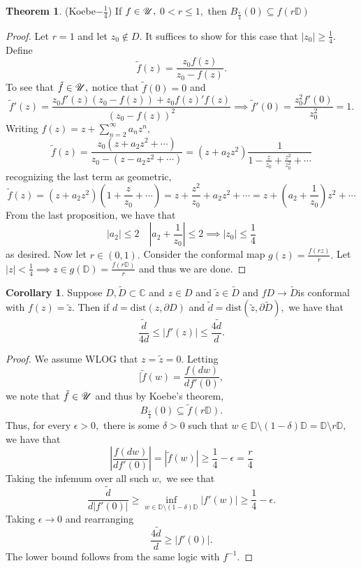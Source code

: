 \documentclass[10pt, oneside]{article}
\newcommand{\bbC}{\mathbb{C}}
\newcommand{\sm}{\setminus}
\theoremstyle{definition}
\newtheorem{thm}{Theorem}
\newtheorem{cor}{Corollary}
\newcommand{\bbC}{\mathbb{C}}
\newcommand{\bbD}{\mathbb{D}}
\newcommand{\sm}{\setminus}
\begin{document}
\begin{thm} (Koebe$-\frac{1}{4}$)
    If $f\in \cal U,$ $0<r\leq 1,$ then $B_{\frac{r}{4}}(0)\subseteq f(r\mathbb{D})$
\end{thm}
\begin{proof}
    Let $r = 1$ and let $z_0 \notin D.$ It suffices to show for this case that $|z_0| \geq \frac{1}{4}.$ Define 
    \[\tilde{f}(z) = \frac{z_0 f(z)}{z_0 - f(z)}.\] To see that $\tilde{f} \in \cal U,$ notice that $\tilde{f}(0) = 0$ and 
    \[\tilde{f}'(z) = \frac{z_0f'(z)(z_0 - f(z)) + z_0f(z)'f(z)}{(z_0 - f(z))^2} \implies \tilde{f}'(0) = \frac{z_0^2 f'(0)}{z_0^2} = 1.\] Writing $f(z) = z + \sum_{n=2}^\infty a_n z^n,$ 
    \[\tilde{f}(z) = \frac{z_0(z + a_2z^2 + \cdots)}{z_0 - (z - a_2z^2 + \cdots)}= (z + a_2z^2)\frac{1}{1 - \frac{z}{z_0} + \frac{z^2}{z_0^2} + \cdots} \] recognizing the last term as geometric, 
    \[\tilde{f}(z) = (z + a_2z^2)(1 + \frac{z}{z_0} + \cdots) = z + \frac{z^2}{z_0} + a_2z^2 + \cdots = z + (a_2 + \frac{1}{z_0})z^2 + \cdots\] From the last proposition, we have that 
    \[|a_2| \leq 2 \quad |a_2 + \frac{1}{z_0}| \leq 2 \implies |z_0| \leq \frac{1}{4}\] as desired. Now let $r \in (0,1).$ Consider the conformal map $g(z) = \frac{f(rz)}{r}.$ Let $|z| < \frac{1}{4} \implies z \in g(\bbD) = \frac{f(r\mathbb{D})}{r}$ and thus we are done.
\end{proof}

\begin{cor}
    Suppose $D, \tilde{D}\subset \bbC$ and $z \in D$ and $\tilde{z}\in \tilde{D}$ and $f D \to \tilde{D}$is conformal with $f(z) = \tilde{z}.$ Then if $d = \text{dist}(z, \partial D)$ and $\tilde{d}= \text{dist}(\tilde{z}, \partial \tilde{D}),$ we have that 
    \[\frac{\tilde{d}}{4d} \leq |f'(z)| \leq \frac{4\tilde{d}}{d}.\]
\end{cor}
\begin{proof}
    We assume WLOG that $z = \tilde{z} = 0.$ Letting 
    \[[\tilde{f}(w) = \frac{f(dw)}{df'(0)},\] we note that $\tilde{f} \in \cal U$ and thus by Koebe's theorem, 
    \[B_{\frac{r}{4}}(0) \subseteq \tilde{f}(r\mathbb{D}).\] Thus, for every $\epsilon>0,$ there is some $\delta>0$ such that $w \in \mathbb{D}\sm (1-\delta)\mathbb{D} = \mathbb{D}\sm r\mathbb{D},$ we have that 
    \[|\frac{f(dw)}{df'(0)}| = |\tilde{f}(w)| \geq \frac{1}{4} - \epsilon = \frac{r}{4}\] Taking the infemum over all such $w,$ we see that 
    \[\frac{\tilde{d}}{d|f'(0)|} \geq \inf _{w \in \mathbb{D}\sm (1-\delta)\mathbb{D}}|f'(w)|  \geq \frac{1}{4} - \epsilon.\] Taking $\epsilon\to 0$ and rearranging 
    \[\frac{4\tilde{d}}{d} \geq |f'(0)|.\] The lower bound follows from the same logic with $f^{-1}.$
\end{proof}
\end{document}
